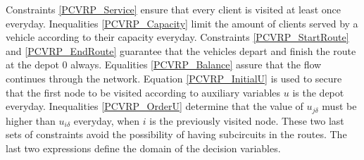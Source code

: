 \documentclass[preprint,review,12pt]{elsarticle}
\begin{document}
Constraints \eqref{PCVRP_Service} ensure that every client is visited at least once everyday. Inequalities \eqref{PCVRP_Capacity} limit the amount of clients served by a vehicle according to their capacity everyday. Constraints \eqref{PCVRP_StartRoute} and \eqref{PCVRP_EndRoute} guarantee that the vehicles depart and finish the route at the depot 0 always. Equalities \eqref{PCVRP_Balance} assure that the flow continues through the network. Equation \eqref{PCVRP_InitialU} is used to secure that the first node to be visited according to auxiliary variables $u$ is the depot everyday. Inequalities \eqref{PCVRP_OrderU} determine that the value of $u_{j\delta}$ must be higher than $u_{i\delta}$ everyday, when $i$ is the previously visited node. These two last sets of constraints avoid the possibility of having subcircuits in the routes. The last two expressions define the domain of the decision variables.
\end{document}
